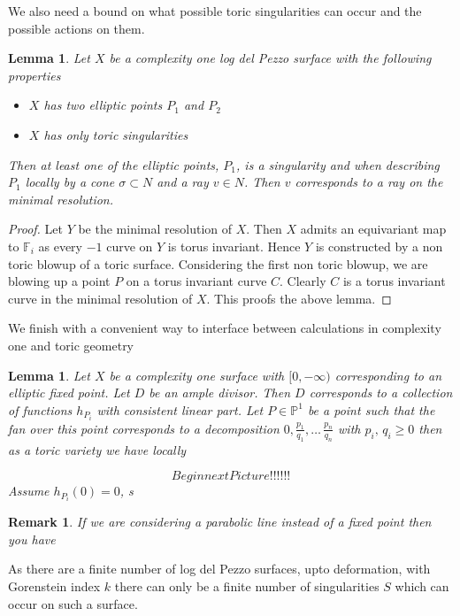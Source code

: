 \documentclass[11pt]{amsart}
\theoremstyle{plain}
\newtheorem{lem}[thm]{Lemma}
\newtheorem*{rem}{Remark}
\newcommand{\mb}[1]{\mathbb{#1}}
\begin{document}
We also need a bound on what possible toric singularities can occur and the possible actions on them.

\begin{lem}
Let $X$ be a complexity one log del Pezzo surface with the following properties 
\begin{itemize}
\item $X$ has two elliptic points $P_1$ and $P_2$
\item $X$ has only toric singularities
\end{itemize}

Then at least one of the elliptic points, $P_1$, is a singularity and when describing $P_1$ locally by a cone $\sigma \subset N$ and a ray $v \in N$. Then $v$ corresponds to a ray on the minimal resolution.
\end{lem}

\begin{proof}
Let $Y$ be the minimal resolution of $X$. Then $X$ admits an equivariant map to $\mb{F}_i$ as every $-1$ curve on $Y$ is torus invariant. Hence $Y$ is constructed by a non toric blowup of a toric surface. Considering the first non toric blowup, we are blowing up a point $P$ on a torus invariant curve $C$. Clearly $C$ is a torus invariant curve in the minimal resolution of $X$. This proofs the above lemma.


\end{proof}

We finish with a convenient way to interface between calculations in complexity one and toric geometry
\begin{lem}
Let $X$ be a complexity one surface with $[0, -\infty)$ corresponding to an elliptic fixed point. Let $D$ be an ample divisor. Then $D$ corresponds to a collection of functions $h_{P_i}$ with consistent linear part. Let $P \in \mb{P}^1$ be a point such that the fan over this point corresponds to a decomposition $0, \frac{p_1}{q_1}, \dots \, \frac{p_n}{q_n}$ with $p_i, \, q_i \geq 0$ then as a toric variety we have locally 

\[
Begin next Picture!!!!!!
\]
Assume $h_{P_i}(0) = 0$, s
\end{lem}

\begin{rem}
If we are considering a parabolic line instead of a fixed point then you have 
\end{rem}

As there are a finite number of log del Pezzo surfaces, upto deformation, with Gorenstein index $k$ there can only be a finite number of singularities $S$ which can occur on such a surface. 
\end{document}
